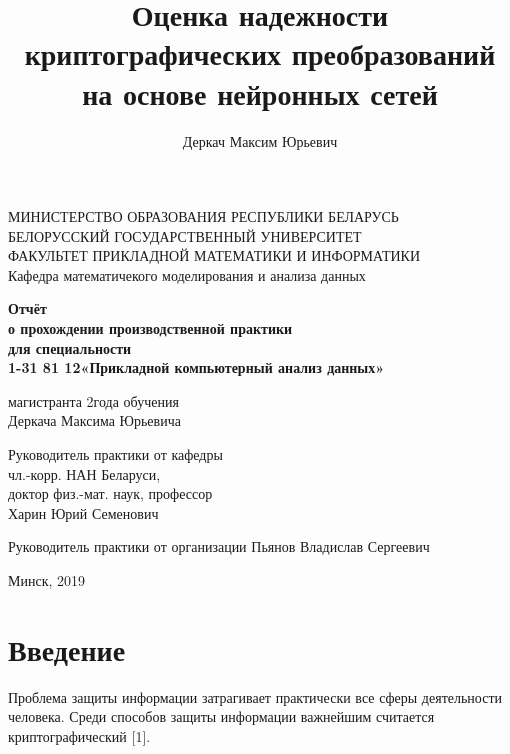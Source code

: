 \documentclass[a4paper,12pt,twoside]{article}
\author{Деркач Максим Юрьевич}
\title{Оценка надежности криптографических преобразований на основе нейронных сетей}
\begin{document}
	\begin{center}
		{МИНИСТЕРСТВО  ОБРАЗОВАНИЯ  РЕСПУБЛИКИ  БЕЛАРУСЬ\\
			БЕЛОРУССКИЙ ГОСУДАРСТВЕННЫЙ УНИВЕРСИТЕТ\\
			ФАКУЛЬТЕТ ПРИКЛАДНОЙ МАТЕМАТИКИ И ИНФОРМАТИКИ} \\
		{Кафедра математичекого моделирования и анализа данных}
		
	\end{center}
	
	\begin{center}
		\bigskip
		\bigskip
		\bigskip
		\bigskip
		\textbf{Отчёт\\ о прохождении производственной практики\\ для специальности \\
		1-31 81 12«Прикладной компьютерный анализ данных»}
	\end{center}
	
	
	\hfil\hfil\hfil\hfil	магистранта 2года обучения\\
	\bigskip
	\hfil\hfil\hfil\hfil	Деркача Максима Юрьевича\\
	\bigskip
	
	\hfil\hfil\hfil\hfil	Руководитель практики от кафедры\\
	\bigskip
	\hfil\hfil\hfil\hfil	чл.-корр. НАН Беларуси,\\
	\bigskip
	\hfil\hfil\hfil\hfil	доктор физ.-мат. наук, профессор\\
	\bigskip
	\hfil\hfil\hfil\hfil	Харин Юрий Семенович\\
	\bigskip
	
	\hfil\hfil\hfil\hfil	Руководитель практики от организации
	\bigskip
	\hfil\hfil\hfil\hfil	Пьянов Владислав Сергеевич\\
	
	
	
	\begin{center}
		Минск, 2019
	\end{center}
	
	
	\newpage
	
	 {
    \renewcommand{\contentsname}{Оглавление}
    \tableofcontents
  	}
	
	\section{Введение}
	\bigskip
	
	Проблема защиты информации затрагивает практически все сферы деятельности человека. Среди способов защиты информации важнейшим считается криптографический [1]. 
	
\end{document}
